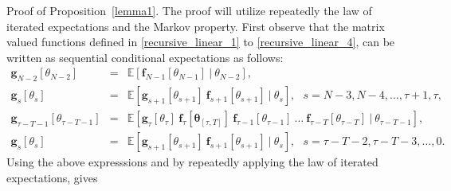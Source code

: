 \documentclass[letterpaper,11pt]{article}
\begin{document}
Proof of Proposition~\ref{lemma1}.
The proof will utilize repeatedly the law of iterated expectations and the Markov property. 
First observe that the matrix valued functions defined in \eqref{recursive_linear_1} to
\eqref{recursive_linear_4},
can be written as sequential conditional expectations as follows:
\begin{eqnarray*}
	\nonumber
	\mathbf{g}_{N-2}[\theta_{N-2}] & = & \mathbb{E}[\mathbf{f}_{N-1}[\theta_{N-1}] ~|~\theta_{N-2}],  \\
	\nonumber
	\mathbf{g}_{s}[\theta_{s}] & = &   \mathbb{E}[\mathbf{g}_{s+1}[\theta_{s+1}]~ \mathbf{f}_{s+1}[\theta_{s+1}] ~|~\theta_s], ~~~
	s = N-3, N-4, \hdots, \tau+1, \tau,  \\
	\mathbf{g}_{\tau-T-1}[\theta_{\tau-T-1}] & = &
	\mathbb{E}[\mathbf{g}_{\tau}[\theta_{\tau}] ~ \mathbf{f}_{\tau}[\bm{\theta}_{[\tau,T]}] ~ 
	\mathbf{f}_{\tau-1}[\theta_{\tau-1}]  ~ \hdots ~ \mathbf{f}_{\tau-T}[\theta_{\tau-T}]~|~\theta_{\tau-T-1}], \\
	\mathbf{g}_{s}[\theta_{s}] & = &  \mathbb{E}[\mathbf{g}_{s+1}[\theta_{s+1}]~ \mathbf{f}_{s+1}[\theta_{s+1}] ~|~\theta_s], ~~~
	s = \tau - T -2 ,  \tau - T - 3, \hdots, 0.  
\end{eqnarray*}
Using the above expresssions and by repeatedly applying the law of iterated expectations, gives
\end{document}
